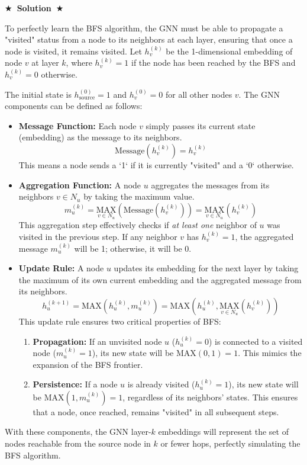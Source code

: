 \documentclass{article}
\numberwithin{figure}{section}
\newcommand{\Solution}[1]{%
	{%
		\medskip
		\color{red}
		\bf $\bigstar$~\sf\textbf{Solution}~$\bigstar$ \sf
		#1
	}
	\bigskip
}
\begin{document}
	\Solution{
		To perfectly learn the BFS algorithm, the GNN must be able to propagate a "visited" status from a node to its neighbors at each layer, ensuring that once a node is visited, it remains visited. Let $h_v^{(k)}$ be the 1-dimensional embedding of node $v$ at layer $k$, where $h_v^{(k)}=1$ if the node has been reached by the BFS and $h_v^{(k)}=0$ otherwise.
		
		The initial state is $h_{\text{source}}^{(0)} = 1$ and $h_v^{(0)} = 0$ for all other nodes $v$. The GNN components can be defined as follows:
		
		\begin{itemize}
			\item \textbf{Message Function:} Each node $v$ simply passes its current state (embedding) as the message to its neighbors.
			\[ \text{Message}(h_v^{(k)}) = h_v^{(k)} \]
			This means a node sends a `1` if it is currently "visited" and a `0` otherwise.
			
			\item \textbf{Aggregation Function:} A node $u$ aggregates the messages from its neighbors $v \in N_u$ by taking the maximum value.
			\[ m_u^{(k)} = \underset{v \in N_u}{\text{MAX}} \left( \text{Message}(h_v^{(k)}) \right) = \underset{v \in N_u}{\text{MAX}} \left( h_v^{(k)} \right) \]
			This aggregation step effectively checks if \textit{at least one} neighbor of $u$ was visited in the previous step. If any neighbor $v$ has $h_v^{(k)}=1$, the aggregated message $m_u^{(k)}$ will be 1; otherwise, it will be 0.
			
			\item \textbf{Update Rule:} A node $u$ updates its embedding for the next layer by taking the maximum of its own current embedding and the aggregated message from its neighbors.
			\[ h_u^{(k+1)} = \text{MAX} \left( h_u^{(k)}, m_u^{(k)} \right) = \text{MAX} \left( h_u^{(k)}, \underset{v \in N_u}{\text{MAX}}(h_v^{(k)}) \right) \]
			This update rule ensures two critical properties of BFS:
			\begin{enumerate}
				\item \textbf{Propagation:} If an unvisited node $u$ ($h_u^{(k)}=0$) is connected to a visited node ($m_u^{(k)}=1$), its new state will be $\text{MAX}(0, 1) = 1$. This mimics the expansion of the BFS frontier.
				\item \textbf{Persistence:} If a node $u$ is already visited ($h_u^{(k)}=1$), its new state will be $\text{MAX}(1, m_u^{(k)}) = 1$, regardless of its neighbors' states. This ensures that a node, once reached, remains "visited" in all subsequent steps.
			\end{enumerate}
		\end{itemize}
		
		With these components, the GNN layer-$k$ embeddings will represent the set of nodes reachable from the source node in $k$ or fewer hops, perfectly simulating the BFS algorithm.
	}
	
\end{document}
